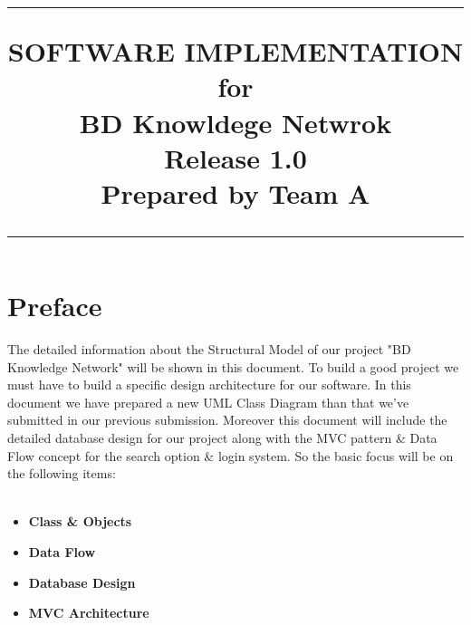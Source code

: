 \documentclass{scrreprt}
\title{%
\flushright
\rule{16cm}{5pt}\vskip1cm
\Huge{SOFTWARE IMPLEMENTATION}\\
\vspace{2cm}
for\\
\vspace{2cm}
BD Knowldege Netwrok\\
\vspace{2cm}
\LARGE{Release 1.0\\}
\vspace{4cm}
Prepared by Team A\\
\vfill
\rule{16cm}{5pt}
}
\date{}
\begin{document}
\cfoot{\thepage}
\maketitle
\tableofcontents
\chapter*{Preface}
The detailed information about the Structural Model of our project "BD Knowledge Network" will be shown in this document. To build a good project we must have to build a specific design architecture for our software. In this document we have prepared a new UML Class Diagram than that we've submitted in our previous submission. Moreover this document will include the detailed database design for our project along with the MVC pattern \& Data Flow concept for the search option \& login system. So the basic focus will be on the following items:\\\\
\begin{itemize}
\item \textbf{Class \& Objects}
\item \textbf{Data Flow}
\item \textbf{Database Design}
\item \textbf{MVC Architecture}
\end{itemize}
\end{document}
